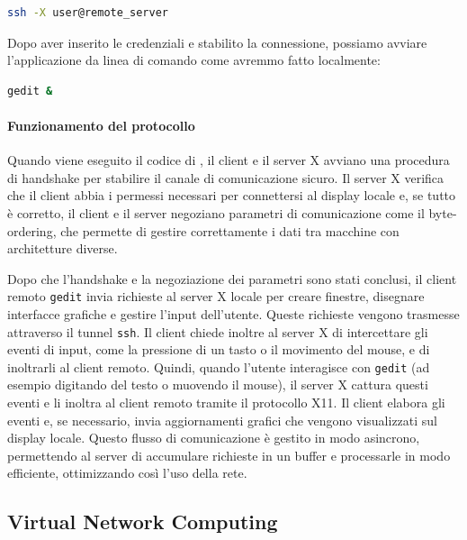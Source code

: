 \documentclass[12pt,a4paper,openright,twoside]{book}
\begin{document}
\begin{lstlisting}[caption={Connessione remota con X forwarding}, label={lst:ssh-x}, language=bash]
ssh -X user@remote_server
\end{lstlisting}

Dopo aver inserito le credenziali e stabilito la connessione, possiamo avviare l'applicazione da linea di comando come avremmo fatto localmente:

\begin{lstlisting}[caption={Esecuzione di gedit su server remoto}, label={lst:gedit}, language=bash]
gedit &
\end{lstlisting}

\paragraph{Funzionamento del protocollo}

Quando viene eseguito il codice di ,
il client e il server X avviano una procedura di handshake per stabilire il canale di comunicazione sicuro.
%
Il server X verifica che il client abbia i permessi necessari per connettersi al display locale e,
se tutto è corretto,
il client e il server negoziano parametri di comunicazione come il byte-ordering,
che permette di gestire correttamente i dati tra macchine con architetture diverse.

Dopo che l'handshake e la negoziazione dei parametri sono stati conclusi,
il client remoto \texttt{gedit} invia richieste al server X locale per creare finestre, disegnare interfacce grafiche e gestire l'input dell'utente.
%
Queste richieste vengono trasmesse attraverso il tunnel \texttt{ssh}.
%
Il client chiede inoltre al server X di intercettare gli eventi di input, come la pressione di un tasto o il movimento del mouse, e di inoltrarli al client remoto.
%
Quindi, quando l'utente interagisce con \texttt{gedit} (ad esempio digitando del testo o muovendo il mouse),
il server X cattura questi eventi e li inoltra al client remoto tramite il protocollo X11.
%
Il client elabora gli eventi e, se necessario, invia aggiornamenti grafici che vengono visualizzati sul display locale.
%
Questo flusso di comunicazione è gestito in modo asincrono, permettendo al server di accumulare richieste in un buffer e processarle in modo efficiente, ottimizzando così l'uso della rete.

\subsection{Virtual Network Computing}
\end{document}
